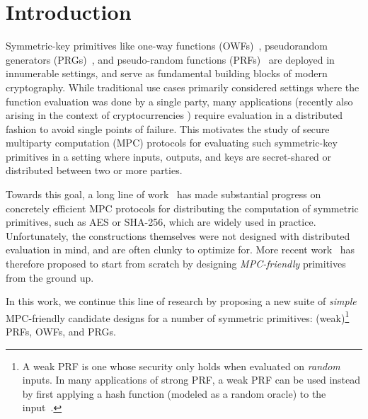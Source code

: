 
\section{Introduction}
\label{sec:introduction}



\medskip

Symmetric-key primitives like one-way functions (OWFs)~\cite{?},
 pseudorandom generators (PRGs)~\cite{blum1984-prg,yao1982-prg}, 
and pseudo-random functions (PRFs)~\cite{goldreich1984-prf} are deployed in innumerable settings, and serve as fundamental building blocks of modern cryptography. While traditional use cases primarily considered settings where the function evaluation was done by a single party, many applications (recently also arising in the context of cryptocurrencies ) require evaluation in a distributed fashion to avoid single points of failure. This motivates the study of secure multiparty computation (MPC) protocols for evaluating such symmetric-key primitives in a setting where inputs, outputs, and keys are secret-shared or distributed between two or more parties.

Towards this goal, a long line of work~\cite{damgard2010-aes, pinkas2009-aes, wang2017-mpc} has made substantial progress on concretely efficient MPC protocols for distributing the computation of symmetric primitives, such as AES or SHA-256, which are widely used in practice. Unfortunately, the constructions themselves were not designed with distributed evaluation in mind, and are often clunky to optimize for. More recent work~\cite{albrecht2015-lowmc, grassi2016-mpcfriendly, boneh2018-darkmatter} has therefore proposed to start from scratch by designing \textit{MPC-friendly} primitives from the ground up. 

In this work, we continue this line of research by proposing a new suite of \textit{simple} MPC-friendly candidate designs for a number of symmetric primitives: (weak)\footnote{A weak PRF is one whose security only holds when evaluated on {\em random} inputs. In many applications of strong PRF, a weak PRF can be used instead by first applying a hash function (modeled as a random oracle) to the input~\cite{someweakPRFref}.
} PRFs, OWFs, and PRGs.


